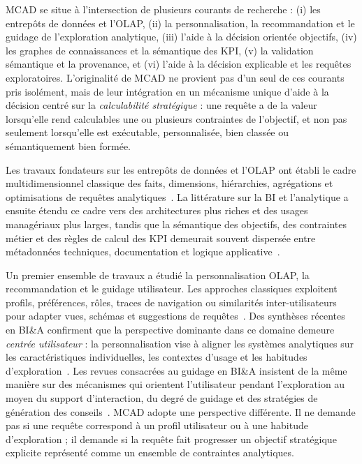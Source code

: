 \documentclass[journal]{IEEEtran}
\begin{document}
MCAD se situe à l'intersection de plusieurs courants de recherche : (i) les entrepôts de données et l'OLAP, (ii) la personnalisation, la recommandation et le guidage de l'exploration analytique, (iii) l'aide à la décision orientée objectifs, (iv) les graphes de connaissances et la sémantique des KPI, (v) la validation sémantique et la provenance, et (vi) l'aide à la décision explicable et les requêtes exploratoires. L'originalité de MCAD ne provient pas d'un seul de ces courants pris isolément, mais de leur intégration en un mécanisme unique d'aide à la décision centré sur la \emph{calculabilité stratégique} : une requête a de la valeur lorsqu'elle rend calculables une ou plusieurs contraintes de l'objectif, et non pas seulement lorsqu'elle est exécutable, personnalisée, bien classée ou sémantiquement bien formée.

Les travaux fondateurs sur les entrepôts de données et l'OLAP ont établi le cadre multidimensionnel classique des faits, dimensions, hiérarchies, agrégations et optimisations de requêtes analytiques~\cite{ChaudhuriDayal97,KimballRoss2013}. La littérature sur la BI et l'analytique a ensuite étendu ce cadre vers des architectures plus riches et des usages managériaux plus larges, tandis que la sémantique des objectifs, des contraintes métier et des règles de calcul des KPI demeurait souvent dispersée entre métadonnées techniques, documentation et logique applicative~\cite{ChenBI2012}.

Un premier ensemble de travaux a étudié la personnalisation OLAP, la recommandation et le guidage utilisateur. Les approches classiques exploitent profils, préférences, rôles, traces de navigation ou similarités inter-utilisateurs pour adapter vues, schémas et suggestions de requêtes~\cite{AissiGouider2012,GarrigosER2009,AligonDSS2015}. Des synthèses récentes en BI\&A confirment que la perspective dominante dans ce domaine demeure \emph{centrée utilisateur} : la personnalisation vise à aligner les systèmes analytiques sur les caractéristiques individuelles, les contextes d'usage et les habitudes d'exploration~\cite{JacobGunklachMaedche2025}. Les revues consacrées au guidage en BI\&A insistent de la même manière sur des mécanismes qui orientent l'utilisateur pendant l'exploration au moyen du support d'interaction, du degré de guidage et des stratégies de génération des conseils~\cite{GunklachNadj2023}. MCAD adopte une perspective différente. Il ne demande pas si une requête correspond à un profil utilisateur ou à une habitude d'exploration ; il demande si la requête fait progresser un objectif stratégique explicite représenté comme un ensemble de contraintes analytiques.
\end{document}
